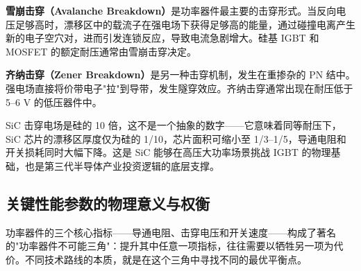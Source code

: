 \textbf{雪崩击穿（Avalanche Breakdown）}是功率器件最主要的击穿形式。当反向电压足够高时，漂移区中的载流子在强电场下获得足够高的能量，通过碰撞电离产生新的电子空穴对，进而引发连锁反应，导致电流急剧增大。硅基 IGBT 和 MOSFET 的额定耐压通常由雪崩击穿决定。

\textbf{齐纳击穿（Zener Breakdown）}是另一种击穿机制，发生在重掺杂的 PN 结中。强电场直接将价带电子"拉"到导带，发生隧穿效应。齐纳击穿通常出现在耐压低于 5–6 V 的低压器件中。

\begin{keyinsight}
SiC 击穿电场是硅的 10 倍，这不是一个抽象的数字——它意味着同等耐压下，SiC 芯片的漂移区厚度仅为硅的 1/10，芯片面积可缩小至 1/3–1/5，导通电阻和开关损耗同时大幅下降。这是 SiC 能够在高压大功率场景挑战 IGBT 的物理基础，也是第三代半导体产业投资逻辑的底层支撑。
\end{keyinsight}

\subsection{关键性能参数的物理意义与权衡}

功率器件的三个核心指标——导通电阻、击穿电压和开关速度——构成了著名的"功率器件不可能三角"：提升其中任意一项指标，往往需要以牺牲另一项为代价。不同技术路线的本质，就是在这个三角中寻找不同的最优平衡点。

